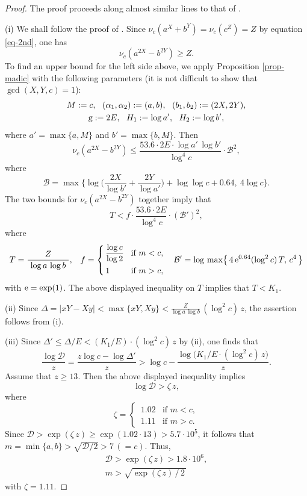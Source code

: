 \documentclass[11pt]{amsart}
\numberwithin{equation}{section}
\begin{document}
\begin{proof}
The proof proceeds along almost similar lines to that of \cite[Lemma 8.1\,(i)-(iv)]{MP3}.
\par
(i) We shall follow the proof of \cite[Lemma 4.2]{MP3}.
Since $\nu_c(a^X+b^Y)=\nu_c(c^Z)=Z$ by equation \eqref{eq-2nd}, one has 
\[
\nu_{c}(a^{2X}-b^{2Y}) \ge Z.
\]
To find an upper bound for the left side above, we apply Proposition \ref{prop-madic} with the following parameters (it is not difficult to show that $\gcd(X,Y,c)=1$):
\begin{gather*}
M:=c, \ \ (\alpha_1,\alpha_2):=(a,b), \ \ (b_1,b_2):=(2X,2Y), \\
{\rm g}:=2E, \ \ H_1:=\log a', \ \ H_2:=\log b',
\end{gather*}
where $a'=\max\{a,M\}$ and $b'=\max\{b,M\}$.
Then
\[
\nu_{c}(a^{2X}-b^{2Y}) \le \frac{53.6 \cdot 2E \cdot \log a'\,\log b'}{\log^4 {c}} \cdot \mathcal B^2,
\]
where
\[
\mathcal B=\max \biggr\{ \log \biggr( \frac{2X}{\log b'}+\frac{2Y}{\log a'} \biggr)+\log \log c + 0.64, \ 4\log c \biggr\}.
\]
The two bounds for $\nu_{c}(a^{2X}-b^{2Y})$ together imply that
\[
T<f\cdot \frac{53.6\cdot 2E}{\log^4 c} \cdot (\mathcal{B}')^2,
\]
where 
\begin{align*}
T=\frac{Z}{ \ \log a\,\log b \ }, \ \ \, f=%
\begin{dcases}
\,\frac{\log c}{\log 2} &\! \text{if $m<c,$} \\
\,1 &\! \text{if $m>c,$}
\end{dcases} \ \ \ 
\mathcal{B}'=\log\,\max \bigr\{\,4\,{\rm e}^{0.64}(\log^2 c)\,T,\,c^4 \,\bigr\}
\end{align*}
with ${\rm e}=\exp(1)$.
The above displayed inequality on $T$ implies that $T<K_1$.
\par
(ii) Since $\Delta =|xY-Xy|<\max\{xY,Xy\}<\frac{Z}{\log a\,\log b}\,(\log^2 c)\,z$, the assertion follows from (i).
\par
(iii) Since $\Delta' \le \Delta/E<(K_1/E)\cdot(\log^2 c)\,z$ by (ii), one finds that
\[
\frac{\log \mathcal D}{z}
=\frac{z \log c - \log \Delta'}{z} 
> \log c-\frac{\log\bigr( K_1/E \cdot (\log^2{c}) \, z \bigr)}{z}.
\]
Assume that $z \ge 13$.
Then the above displayed inequality implies
\begin{equation}\label{c13-Deltaodd-logcalD-l}
\log{\mathcal D}>\zeta \,z,
\end{equation}
where
\[ \zeta=\begin{cases}
\,1.02 & \text{if $m<c,$} \\
\,1.11 & \text{if $m>c.$}
\end{cases}\]
Since $\mathcal D>\exp(\zeta\,z) \ge \exp(1.02\cdot13)>5.7 \cdot 10^5$, it follows that $m=\min\{a,b\} > \sqrt{\mathcal D /2}>7\,(=c)$.
Thus,
\begin{gather}
\mathcal D>\exp(\zeta\,z)>1.8 \cdot 10^6,
\label{c13-calD-l}\\
m %
> \sqrt{\exp(\zeta \,z) \,/\,2\,}%
\label{c13-m-l}
\end{gather}
with $\zeta=1.11$.


\end{proof}
\end{document}
